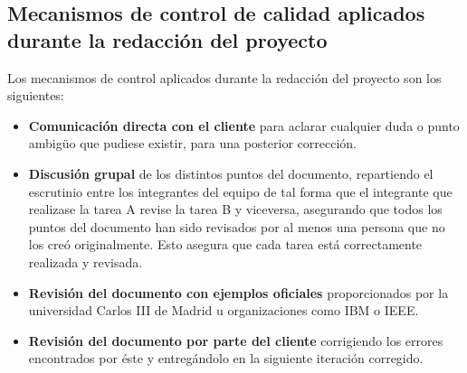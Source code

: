\subsection{Mecanismos de control de calidad aplicados durante la redacción del proyecto}
\par Los mecanismos de control aplicados durante la redacción del proyecto son los siguientes:
\begin{itemize}
	\item \textbf{Comunicación directa con el cliente} para aclarar cualquier duda o punto ambigüo que pudiese existir, para una posterior corrección.
	\item \textbf{Discusión grupal} de los distintos puntos del documento, repartiendo el escrutinio entre los integrantes del equipo de tal forma que el integrante que realizase la tarea A revise la tarea B y viceversa, asegurando que todos los puntos del documento han sido revisados por al menos una persona que no los creó originalmente. Esto asegura que cada tarea está correctamente realizada y revisada.
	\item \textbf{Revisión del documento con ejemplos oficiales} proporcionados por la universidad Carlos III de Madrid u organizaciones como IBM o IEEE.
	\item \textbf{Revisión del documento por parte del cliente} corrigiendo los errores encontrados por éste y entregándolo en la siguiente iteración corregido.
\end{itemize}